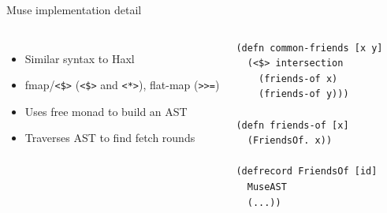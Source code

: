 \documentclass[utf8x,10pt,aspectratio=169]{beamer}
\begin{document}
\begin{frame}[fragile]{Muse implementation detail}
	\begin{columns}
		\begin{itemize}
			\item Similar syntax to Haxl
			\item fmap/\texttt{<\$>} (\texttt{<\$>} and \texttt{<*>}), flat-map (\texttt{>>=})
			\item Uses free monad to build an AST
			\item Traverses AST to find fetch rounds
		\end{itemize}
		\begin{verbatim}
(defn common-friends [x y]
  (<$> intersection 
    (friends-of x) 
    (friends-of y)))

(defn friends-of [x]
  (FriendsOf. x))
  
(defrecord FriendsOf [id]
  MuseAST
  (...))
		\end{verbatim}
	\end{columns}

\end{frame}
\end{document}
